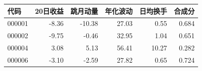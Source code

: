 \begin{tabular}{lrrrrr}
\toprule
代码 & 20日收益 & 跳月动量 & 年化波动 & 日均换手 & 合成分\\
\midrule
000001 & -8.36 & -10.38 & 27.03 & 0.55 & 0.684\\
000002 & -9.75 & -0.46 & 32.95 & 1.04 & 0.651\\
000004 & 3.08 & 5.13 & 56.41 & 10.27 & 0.282\\
000006 & -3.10 & -2.59 & 27.82 & 0.65 & 0.724\\
\bottomrule
\end{tabular}
